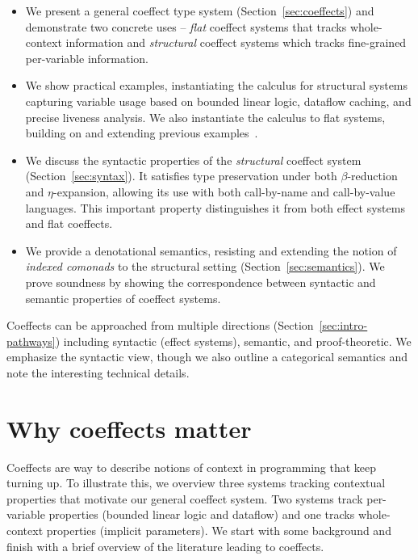 \begin{itemize}
\item We present a general coeffect type system (Section~\ref{sec:coeffects}) and demonstrate two 
  concrete uses -- \emph{flat} coeffect systems that tracks whole-context information and 
  \emph{structural} coeffect systems which tracks fine-grained per-variable information. 

\item We show practical examples, instantiating the calculus for structural systems capturing 
  variable usage based on bounded linear logic, dataflow caching, and precise liveness analysis.
  We also instantiate the calculus to flat systems, building on and extending previous examples~\cite{petricek2013coeffects}.

\item We discuss the syntactic properties of the \emph{structural} coeffect system 
  (Section~\ref{sec:syntax}). It satisfies type preservation under both $\beta$-reduction 
  and $\eta$-expansion, allowing its use with both call-by-name and call-by-value languages.
  This important property distinguishes it from both effect systems and flat coeffects.

\item We provide a denotational semantics, resisting and extending the notion of \emph{indexed comonads} to the 
structural setting (Section~\ref{sec:semantics}). We prove soundness by showing 
  the correspondence between syntactic and semantic properties of coeffect systems.
\end{itemize}

\noindent
Coeffects can be approached from multiple directions (Section~\ref{sec:intro-pathways}) including 
syntactic (effect systems), semantic, and proof-theoretic. We 
emphasize the syntactic view, though we also outline a categorical semantics
and note the interesting technical details. 



\section{Why coeffects matter}
\label{sec:intro-coeffects}

Coeffects are way to describe notions of context in programming that keep turning up. 
To illustrate this, we overview three systems tracking contextual properties that 
 motivate our general coeffect system. Two systems track per-variable properties (bounded 
linear logic and dataflow) and one tracks whole-context properties (implicit parameters).
 We start with some background and finish with a brief overview of the literature leading to coeffects.

